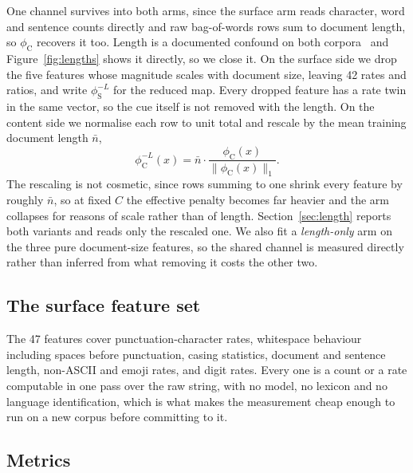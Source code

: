 \documentclass[conference,a4paper]{IEEEtran}
\begin{document}
One channel survives into both arms, since the surface arm reads character, word and sentence counts directly and raw bag-of-words rows sum to document length, so $\phi_{\mathrm{C}}$ recovers it too. Length is a documented confound on both corpora~\cite{Baidya2026detecting} and Figure~\ref{fig:lengths} shows it directly, so we close it. On the surface side we drop the five features whose magnitude scales with document size, leaving 42 rates and ratios, and write $\phi_{\mathrm{S}}^{-L}$ for the reduced map. Every dropped feature has a rate twin in the same vector, so the cue itself is not removed with the length. On the content side we normalise each row to unit total and rescale by the mean training document length $\bar{n}$,
\begin{equation}
\label{eq:l1}
\phi_{\mathrm{C}}^{-L}(x) = \bar{n} \cdot \frac{\phi_{\mathrm{C}}(x)}{\lVert \phi_{\mathrm{C}}(x) \rVert_1} .
\end{equation}
The rescaling is not cosmetic, since rows summing to one shrink every feature by roughly $\bar{n}$, so at fixed $C$ the effective penalty becomes far heavier and the arm collapses for reasons of scale rather than of length. Section~\ref{sec:length} reports both variants and reads only the rescaled one. We also fit a \emph{length-only} arm on the three pure document-size features, so the shared channel is measured directly rather than inferred from what removing it costs the other two.

\subsection{The surface feature set}
\label{sec:features}

The 47 features cover punctuation-character rates, whitespace behaviour including spaces before punctuation, casing statistics, document and sentence length, non-ASCII and emoji rates, and digit rates. Every one is a count or a rate computable in one pass over the raw string, with no model, no lexicon and no language identification, which is what makes the measurement cheap enough to run on a new corpus before committing to it.

\subsection{Metrics}
\end{document}
